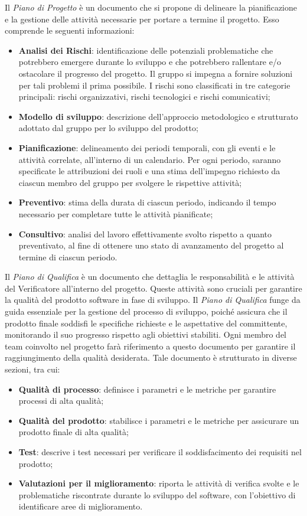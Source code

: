 Il \textit{Piano di Progetto} è un documento che si propone di delineare la pianificazione e la gestione delle attività necessarie per portare a termine il progetto.
Esso comprende le seguenti informazioni:
\begin{itemize}
	\item \textbf{Analisi dei Rischi}: identificazione delle potenziali problematiche che potrebbero emergere durante lo sviluppo e che potrebbero rallentare e/o ostacolare il progresso del progetto. Il gruppo si impegna a fornire soluzioni per tali problemi il prima possibile. I rischi sono classificati in tre categorie principali: rischi organizzativi, rischi tecnologici e rischi comunicativi;
	\item \textbf{Modello di sviluppo}: descrizione dell'approccio metodologico e strutturato adottato dal gruppo per lo sviluppo del prodotto;
	\item \textbf{Pianificazione}: delineamento dei periodi temporali, con gli eventi e le attività correlate, all'interno di un calendario. Per ogni periodo, saranno specificate le attribuzioni dei ruoli e una stima dell'impegno richiesto da ciascun membro del gruppo per svolgere le rispettive attività;
	\item \textbf{Preventivo}: stima della durata di ciascun periodo, indicando il tempo necessario per completare tutte le attività pianificate;
	\item \textbf{Consultivo}: analisi del lavoro effettivamente svolto rispetto a quanto preventivato, al fine di ottenere uno stato di avanzamento del progetto al termine di ciascun periodo.
\end{itemize}

Il \textit{Piano di Qualifica} è un documento che dettaglia le responsabilità e le attività del Verificatore all'interno del progetto.
Queste attività sono cruciali per garantire la qualità del prodotto software in fase di sviluppo.
Il \textit{Piano di Qualifica} funge da guida essenziale per la gestione del processo di sviluppo, poiché assicura che il prodotto finale soddisfi le specifiche richieste e le aspettative del committente, monitorando il suo progresso rispetto agli obiettivi stabiliti.
Ogni membro del team coinvolto nel progetto farà riferimento a questo documento per garantire il raggiungimento della qualità desiderata.
Tale documento è strutturato in diverse sezioni, tra cui:
\begin{itemize}
	\item \textbf{Qualità di processo}: definisce i parametri e le metriche per garantire processi di alta qualità;
	\item \textbf{Qualità del prodotto}: stabilisce i parametri e le metriche per assicurare un prodotto finale di alta qualità;
	\item \textbf{Test}: descrive i test necessari per verificare il soddisfacimento dei requisiti nel prodotto;
	\item \textbf{Valutazioni per il miglioramento}: riporta le attività di verifica svolte e le problematiche riscontrate durante lo sviluppo del software, con l'obiettivo di identificare aree di miglioramento.
\end{itemize}

